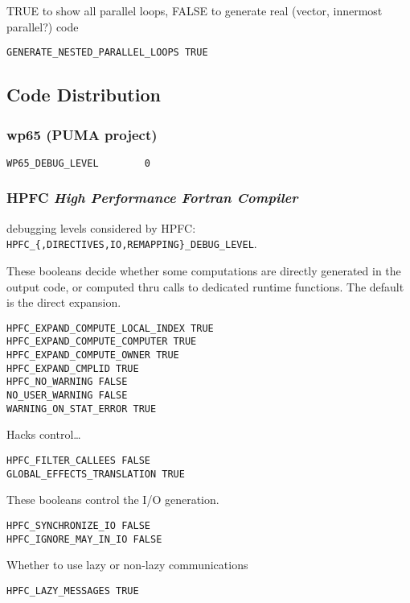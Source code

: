 TRUE to show all parallel loops, FALSE to generate real (vector,
innermost parallel?) code

\begin{verbatim}
GENERATE_NESTED_PARALLEL_LOOPS TRUE
\end{verbatim}

\subsection{Code Distribution}

\subsubsection{wp65 (PUMA project)}

\begin{verbatim}
WP65_DEBUG_LEVEL        0
\end{verbatim}

\subsubsection{HPFC {\em High Performance Fortran Compiler}}

debugging levels considered by HPFC: 
\verb+HPFC_{,DIRECTIVES,IO,REMAPPING}_DEBUG_LEVEL+.

  These booleans decide whether some computations are directly
generated in the output code, or computed thru calls to dedicated
runtime functions. The default is the direct expansion.

\begin{verbatim}
HPFC_EXPAND_COMPUTE_LOCAL_INDEX TRUE
HPFC_EXPAND_COMPUTE_COMPUTER TRUE
HPFC_EXPAND_COMPUTE_OWNER TRUE
HPFC_EXPAND_CMPLID TRUE
HPFC_NO_WARNING FALSE
NO_USER_WARNING FALSE
WARNING_ON_STAT_ERROR TRUE
\end{verbatim}

   Hacks control\ldots

\begin{verbatim}
HPFC_FILTER_CALLEES FALSE
GLOBAL_EFFECTS_TRANSLATION TRUE
\end{verbatim}

  These booleans control the I/O generation.

\begin{verbatim}
HPFC_SYNCHRONIZE_IO FALSE
HPFC_IGNORE_MAY_IN_IO FALSE
\end{verbatim}

  Whether to use lazy or non-lazy communications

\begin{verbatim}
HPFC_LAZY_MESSAGES TRUE
\end{verbatim}


